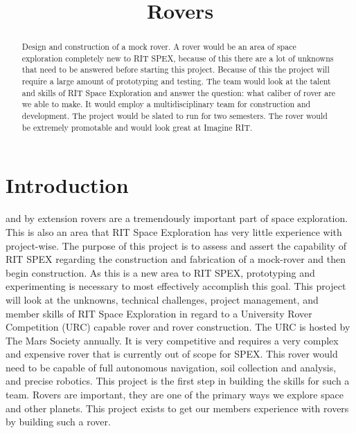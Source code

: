 \documentclass[conference]{IEEEtran} %
\title{Rovers}
\author{
  \IEEEauthorblockN{%
    Thomas~Hall\IEEEauthorrefmark{1}
  }
  \IEEEauthorblockA{%
    RIT Space Exploration, Rochester Institute of Technology \\ %
    Rochester, N.Y. \\
    Email:
    \IEEEauthorrefmark{1}tjh2822@g.rit.edu
  }
}
\begin{document}
\maketitle

\begin{abstract}
Design and construction of a mock rover. 
A rover would be an area of space exploration completely new to RIT SPEX, because of this there are a lot of unknowns that need to be answered before starting this project. 
Because of this the project will require a large amount of prototyping and testing. 
The team would look at the talent and skills of RIT Space Exploration and answer the question: what caliber of rover are we able to make. 
It would employ a multidisciplinary team for construction and development. The project would be slated to run for two semesters. 
The rover would be extremely promotable and would look great at Imagine RIT. 
\end{abstract}

\label{sec:nomenclature}
\newcommand{\nomunit}[1]{%
\renewcommand{\nomentryend}{\hspace*{\fill}#1}}
\renewcommand{\nompreamble}{}

\nomenclature{$\dot{m}$}{Mass flow rate
  \nomunit{\,\si{\kilo\gram\per\second}}}
\nomenclature{$c$}{Speed of light
 \nomunit{\,\SI{2.9979e8}{\meter\per\second}}}
\printnomenclature{}

\section{Introduction}
\label{sec:introduction}

  and by extension rovers are a tremendously important
part of space exploration. 
This is also an area that RIT Space Exploration has very little experience with project-wise.
The purpose of this project is to assess and assert the capability of RIT SPEX regarding the construction and fabrication of a mock-rover and then begin construction. 
As this is a new area to RIT SPEX, prototyping and experimenting is necessary to most effectively accomplish this goal. 
This project will look at the unknowns, technical challenges, project management, and member skills of RIT Space Exploration in regard to a University Rover Competition (URC) capable rover and rover construction. 
The URC is hosted by The Mars Society annually. 
It is very competitive and requires a very complex and expensive rover that is currently out of scope for SPEX. 
This rover would need to be capable of full autonomous navigation, soil collection and analysis, and precise robotics. 
This project is the first step in building the skills for such a team.
Rovers are important, they are one of the primary ways we explore space and other planets. 
This project exists to get our members experience with rovers by building such a rover. 
\end{document}
